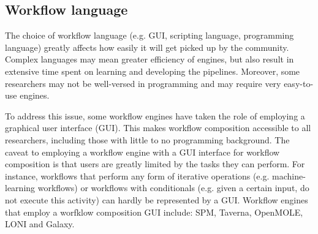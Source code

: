         \subsection{Workflow language}\label{lang}
            The choice of workflow language (e.g. GUI, scripting language,
            programming language) greatly
            affects how easily it will get picked up by the community. Complex
            languages may mean greater efficiency of engines,
            but also result in extensive time spent on learning and developing
            the pipelines. Moreover, some researchers may not be well-versed in
            programming and may require very easy-to-use engines.

            To address this issue, some workflow engines have taken the role
            of employing a graphical user interface (GUI). This makes workflow 
            composition accessible to all researchers, including those with
            little to no programming background. The caveat to employing a 
            workflow engine with a GUI interface for workflow composition is
            that users are greatly limited by the tasks they can perform. For 
            instance, workflows that perform any form of iterative operations
            (e.g. machine-learning workflows) or workflows with conditionals
            (e.g. given a certain input, do not execute this activity) can hardly
            be represented by a GUI. 
            Workflow engines that employ a worfklow composition GUI include:
            SPM, Taverna, OpenMOLE, LONI and Galaxy.


